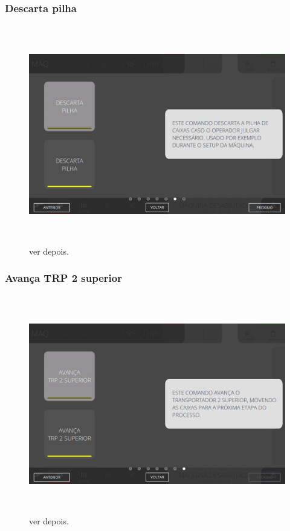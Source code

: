 \newpage
\thispagestyle{fancy}
\vspace*{\fill}
\subsubsection{\small{Descarta pilha}}
\begin{figure}[h]
  \centering
  \includegraphics[width=576px,height=360px]{src/imagesFlexo/08-count/commands/e-6.png}
  \caption{ver depois.}
   \label{}
\end{figure}
\vspace*{\fill}

\newpage
\thispagestyle{fancy}
\vspace*{\fill}
\subsubsection{\small{Avança TRP 2 superior}}
\begin{figure}[h]
  \centering
  \includegraphics[width=576px,height=360px]{src/imagesFlexo/08-count/commands/e-7.png}
  \caption{ver depois.}
   \label{}
\end{figure}
\vspace*{\fill}

